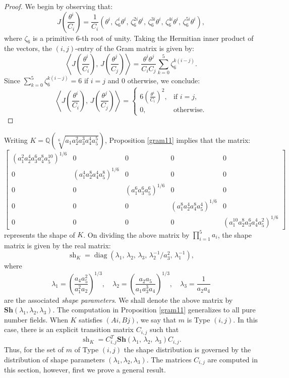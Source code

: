 \documentclass[table]{amsart}
\newcommand{\op}[1]{\operatorname{#1}}
\numberwithin{equation}{section}
\begin{document}
\begin{proof}
We begin by observing that:
\[
J\left( \frac{\theta^i}{C_i} \right)
= \frac{1}{C_i} \left( \theta^i,\, \zeta_6^i \theta^i,\, \zeta_6^{2i} \theta^i,\, \zeta_6^{3i} \theta^i,\, \zeta_6^{4i} \theta^i,\, \zeta_6^{5i} \theta^i \right),
\]
where $\zeta_6$ is a primitive $6$-th root of unity.
Taking the Hermitian inner product of the vectors, the $(i,j)$-entry of the Gram matrix is given by:
\[
\left\langle J\left( \frac{\theta^i}{C_i} \right),\, J\left( \frac{\theta^j}{C_j} \right) \right\rangle
= \frac{\theta^i \theta^j}{C_i C_j} \sum_{k=0}^{5} \zeta_6^{k(i - j)}.
\]
Since $\sum_{k=0}^5 \zeta_6^{k(i-j)} = 6$ if $i = j$ and $0$ otherwise, we conclude:
\[
\left\langle J\left( \frac{\theta^i}{C_i} \right),\, J\left( \frac{\theta^j}{C_j} \right) \right\rangle
= \begin{cases}
6 \left( \frac{\theta^i}{C_i} \right)^2, & \text{if } i = j, \\
0, & \text{otherwise}.
\end{cases}
\]
\end{proof}
\noindent Writing $K = \mathbb{Q}\left(\sqrt[6]{a_1 a_2^2 a_3^3 a_4^4 a_5^5}\right)$, Proposition  \ref{gram11} implies that the matrix:
 \[
\begin{bmatrix}
\left(a_1^2 a_2^4 a_3^6 a_4^8 a_5^{10}\right)^{1/6} & 0 & 0 & 0 & 0 \\[8pt]
0 & \left(a_1^4 a_2^8 a_4^4 a_5^8\right)^{1/6} & 0 & 0 & 0 \\[8pt]
0 & 0 & \left(a_1^6 a_3^6 a_5^6\right)^{1/6} & 0 & 0 \\[8pt]
0 & 0 & 0 & \left(a_1^8 a_2^4 a_4^8 a_5^4\right)^{1/6} & 0 \\[8pt]
0 & 0 & 0 & 0 & \left(a_1^{10} a_2^8 a_3^6 a_4^4 a_5^2\right)^{1/6}
\end{bmatrix}
\]
represents the shape of $K$. On dividing the above matrix by $\prod_{i=1}^5 a_i$, the shape matrix is given by the real matrix: \[\op{sh}_K=\op{diag}\left(\lambda_1,\, \lambda_2,\, \lambda_3,\, \lambda_2^{-1}/ a_3^2,\, \lambda_1^{-1}\right),\] where
$$\lambda_1=\left(\frac{a_4a_5^2}{a_1^2a_2}\right)^{1/3}, \quad \lambda_2=\left(\frac{a_2a_5}{a_1a_3^3a_4}\right)^{1/3}, \quad \lambda_3 = \frac{1}{a_2a_4}$$ are the associated \emph{shape parameters}. We shall denote the above matrix by $\mathbf{Sh}(\lambda_1, \lambda_2, \lambda_3)$. The computation in Proposition \ref{gram11} generalizes to all pure number fields. When $K$ satisfies $(Ai,Bj)$, we say that $m$ is Type $(i,j)$. In this case, there is an explicit transition matrix $C_{i,j}$ such that 
\[\op{sh}_K=C_{i,j}^T \mathbf{Sh}(\lambda_1,\, \lambda_2,\, \lambda_3)C_{i,j}.\] Thus, for the set of $m$ of Type $(i,j)$ the shape distribution is governed by the distribution of shape parameters $(\lambda_1, \lambda_2, \lambda_3)$. The matrices $C_{i,j}$ are computed in this section, however, first we prove a general result.
\end{document}

